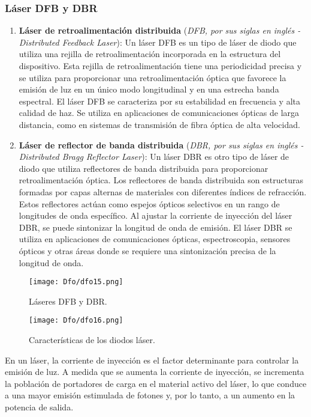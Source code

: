 \documentclass[
	12pt, %
	fleqn, %
	a4paper, %
	oneside, %
]{LegrandOrangeBook}
\begin{document}
\subsubsection{Láser DFB y DBR}
\begin{enumerate}
\item \textbf{Láser de retroalimentación distribuida} (\textit{DFB, por sus siglas en inglés - Distributed Feedback Laser}): Un láser DFB es un tipo de láser de diodo que utiliza una rejilla de retroalimentación incorporada en la estructura del dispositivo. Esta rejilla de retroalimentación tiene una periodicidad precisa y se utiliza para proporcionar una retroalimentación óptica que favorece la emisión de luz en un único modo longitudinal y en una estrecha banda espectral. El láser DFB se caracteriza por su estabilidad en frecuencia y alta calidad de haz. Se utiliza en aplicaciones de comunicaciones ópticas de larga distancia, como en sistemas de transmisión de fibra óptica de alta velocidad.
\item \textbf{Láser de reflector de banda distribuida} (\textit{DBR, por sus siglas en inglés - Distributed Bragg Reflector Laser}): Un láser DBR es otro tipo de láser de diodo que utiliza reflectores de banda distribuida para proporcionar retroalimentación óptica. Los reflectores de banda distribuida son estructuras formadas por capas alternas de materiales con diferentes índices de refracción. Estos reflectores actúan como espejos ópticos selectivos en un rango de longitudes de onda específico. Al ajustar la corriente de inyección del láser DBR, se puede sintonizar la longitud de onda de emisión. El láser DBR se utiliza en aplicaciones de comunicaciones ópticas, espectroscopia, sensores ópticos y otras áreas donde se requiere una sintonización precisa de la longitud de onda.
\end{enumerate}
\begin{figure}[H]
\centering
\texttt{[image: Dfo/dfo15.png]}
\caption{Láseres DFB y DBR.}
\end{figure}
\begin{figure}[H]
\centering
\texttt{[image: Dfo/dfo16.png]}
\caption{Características de los diodos láser.}
\end{figure}
En un láser, la corriente de inyección es el factor determinante para controlar la emisión de luz. A medida que se aumenta la corriente de inyección, se incrementa la población de portadores de carga en el material activo del láser, lo que conduce a una mayor emisión estimulada de fotones y, por lo tanto, a un aumento en la potencia de salida. \\
\end{document}

